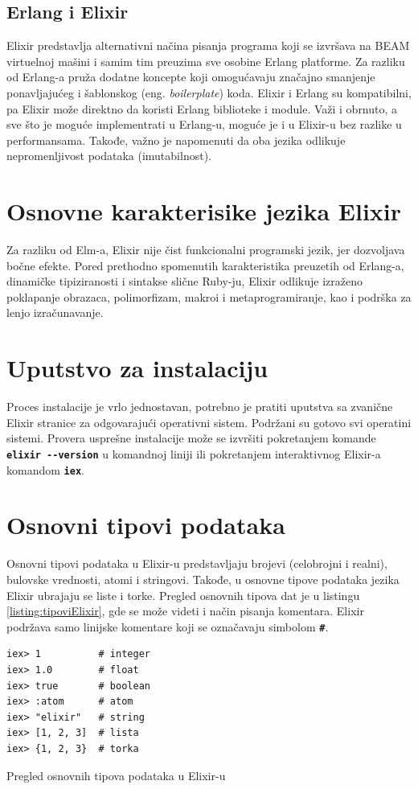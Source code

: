 \documentclass[12pt,oneside]{memoir}
\begin{document}
\subsection{Erlang i Elixir}
Elixir predstavlja alternativni načina pisanja programa koji se izvršava na BEAM virtuelnoj
mašini i samim tim preuzima sve osobine Erlang platforme. Za razliku od Erlang-a pruža dodatne
koncepte koji omogućavaju značajno smanjenje ponavljajućeg i šablonskog (eng.
\emph{boilerplate}) koda. Elixir i Erlang su kompatibilni, pa Elixir može direktno da koristi
Erlang biblioteke i module. Važi i obrnuto, a sve što je moguće implementrati u Erlang-u,
moguće je i u Elixir-u bez razlike u performansama. Takođe, važno je napomenuti da oba jezika
odlikuje nepromenljivost podataka (imutabilnost).
\section{Osnovne karakterisike jezika Elixir}
Za razliku od Elm-a, Elixir nije čist funkcionalni programski jezik, jer dozvoljava bočne efekte.
Pored prethodno spomenutih karakteristika preuzetih od Erlang-a, dinamičke tipiziranosti i 
sintakse slične Ruby-ju, Elixir odlikuje izraženo poklapanje obrazaca, polimorfizam, makroi
i metaprogramiranje, kao i podrška za lenjo izračunavanje.   
\section{Uputstvo za instalaciju}
Proces instalacije je vrlo jednostavan, potrebno je pratiti uputstva sa zvanične Elixir
stranice \cite{elixir} za odgovarajući operativni sistem. Podržani su gotovo svi operatini
sistemi. Provera usprešne instalacije može se izvršiti pokretanjem komande
\textbf{\texttt{elixir -{}-version}} u komandnoj liniji ili pokretanjem interaktivnog Elixir-a
komandom \textbf{\texttt{iex}}.

\section{Osnovni tipovi podataka}
Osnovni tipovi podataka u Elixir-u predstavljaju brojevi (celobrojni i realni), bulovske
vrednosti, atomi i stringovi. Takođe, u osnovne tipove podataka jezika Elixir ubrajaju se liste i torke. Pregled
osnovnih tipova dat je u listingu \ref{listing:tipoviElixir}, gde se može videti i način pisanja
komentara. Elixir podržava samo linijske komentare koji se označavaju simbolom \texttt{\textbf{\#}}.
\begin{listing}[!h]
\begin{verbatim}
iex> 1          # integer
iex> 1.0        # float
iex> true       # boolean 
iex> :atom      # atom
iex> "elixir"   # string
iex> [1, 2, 3]  # lista
iex> {1, 2, 3}  # torka
\end{verbatim}
\caption{Pregled osnovnih tipova podataka u Elixir-u}
\label{listing:tipoviElixir}
\end{listing}
\end{document}
